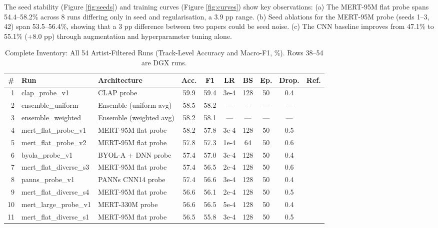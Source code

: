 \documentclass[conference]{IEEEtran}
\begin{document}
The seed stability (Figure \ref{fig:seeds}) and training curves (Figure
\ref{fig:curves}) show key observations: (a) The MERT-95M flat probe
spans 54.4--58.2\% across 8 runs differing only in seed and
regularisation, a 3.9 pp range. (b) Seed ablations for the MERT-95M
probe (seeds 1--3, 42) span 53.5--56.4\%, showing that a 3 pp
difference between two papers could be seed noise. (c) The CNN baseline
improves from 47.1\% to 55.1\% (+8.0 pp) through augmentation and
hyperparameter tuning alone.

\begin{table}[t]
\centering
\caption{Complete Inventory: All 54 Artist-Filtered Runs (Track-Level Accuracy and Macro-F1, \%). Rows 38--54 are DGX runs.}
\label{tab:allruns}
\scriptsize
\begin{tabular}{rllccccccl}
\toprule
\textbf{\#} & \textbf{Run} & \textbf{Architecture} & \textbf{Acc.} & \textbf{F1} & \textbf{LR} & \textbf{BS} & \textbf{Ep.} & \textbf{Drop.} & \textbf{Ref.} \\
\midrule
1 & clap\_probe\_v1 & CLAP probe & 59.9 & 59.4 & 3e-4 & 128 & 50 & 0.4 & \cite{wu2023clap} \\
2 & ensemble\_uniform & Ensemble (uniform avg) & 58.5 & 58.2 & --- & --- & --- & --- & \cite{kittler1998combining} \\
3 & ensemble\_weighted & Ensemble (weighted avg) & 58.2 & 58.1 & --- & --- & --- & --- & \cite{kittler1998combining} \\
4 & mert\_flat\_probe\_v1 & MERT-95M flat probe & 58.2 & 57.8 & 3e-4 & 128 & 50 & 0.5 & \cite{li2023mert} \\
5 & mert\_flat\_probe\_v2 & MERT-95M flat probe & 57.8 & 57.3 & 1e-4 & 64 & 50 & 0.6 & \cite{li2023mert} \\
6 & byola\_probe\_v1 & BYOL-A + DNN probe & 57.4 & 57.0 & 3e-4 & 128 & 50 & 0.4 & \cite{niizumi2023byola} \\
7 & mert\_flat\_diverse\_s3 & MERT-95M flat probe & 57.4 & 56.5 & 2e-4 & 128 & 50 & 0.6 & \cite{li2023mert} \\
8 & panns\_probe\_v1 & PANNs CNN14 probe & 57.4 & 56.6 & 3e-4 & 128 & 50 & 0.4 & \cite{kong2020panns} \\
9 & mert\_flat\_diverse\_s4 & MERT-95M flat probe & 56.6 & 56.1 & 2e-4 & 128 & 50 & 0.5 & \cite{li2023mert} \\
10 & mert\_large\_probe\_v1 & MERT-330M probe & 56.6 & 56.5 & 5e-4 & 128 & 50 & 0.4 & \cite{li2023mert} \\
11 & mert\_flat\_diverse\_s1 & MERT-95M flat probe & 56.5 & 55.8 & 3e-4 & 128 & 50 & 0.5 & \cite{li2023mert} \\

\end{tabular}
\end{table}
\end{document}
